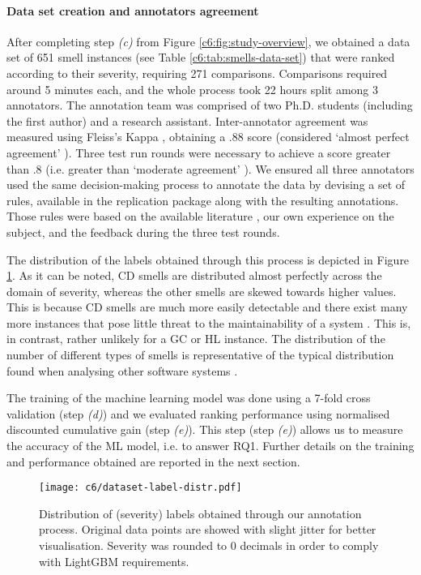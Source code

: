 \paragraph{Data set creation and annotators agreement}
After completing step \emph{(c)} from Figure \ref{c6:fig:study-overview}, we obtained a data set of 651 smell instances (see Table \ref{c6:tab:smells-data-set}) that were ranked according to their severity, requiring 271 comparisons.
Comparisons required around 5 minutes each, and the whole process took 22 hours split among 3 annotators.
The annotation team was comprised of two Ph.D. students (including the first author) and a research assistant.
Inter-annotator agreement was measured using Fleiss's Kappa \cite{Fleiss1971}, obtaining a $.88$ score (considered `almost perfect agreement' \cite{Fleiss1971}).
Three test run rounds were necessary to achieve a score greater than $.8$ (i.e. greater than `moderate agreement' \cite{Fleiss1971}). 
We ensured all three annotators used the same decision-making process to annotate the data by devising a set of rules, available in the replication package \cite{ReplicationPackageC6} along with the resulting annotations.
Those rules were based on the available literature \cite{Laval2012,AlMutawa2014}, our own experience on the subject, and the feedback during the three test rounds.

The distribution of the labels obtained through this process is depicted in Figure \ref{c6:fig:dataset-label-distr}.
As it can be noted, CD smells are distributed almost perfectly across the domain of severity, whereas the other smells are skewed towards higher values.
This is because CD smells are much more easily detectable and there exist many more instances that pose little threat to the maintainability of a system \cite{AlMutawa2014,Laval2012}.
This is, in contrast, rather unlikely for a GC or HL instance.
The distribution of the number of different types of smells is representative of the typical distribution found when analysing other software systems \cite{Sas2021}.

The training of the machine learning model was done using a 7-fold cross validation (step \emph{(d)}) and we evaluated ranking performance using normalised discounted cumulative gain (step \emph{(e)}).
This step (step \emph{(e)}) allows us to measure the accuracy of the ML model, i.e. to answer RQ1.
Further details on the training and performance obtained are reported in the next section.

\begin{figure}
    \centering
    \texttt{[image: c6/dataset-label-distr.pdf]}
    \caption{Distribution of (severity) labels obtained through our annotation process. Original data points are showed with slight jitter for better visualisation. Severity was rounded to 0 decimals in order to comply with LightGBM requirements.}\label{c6:fig:dataset-label-distr}
\end{figure}

